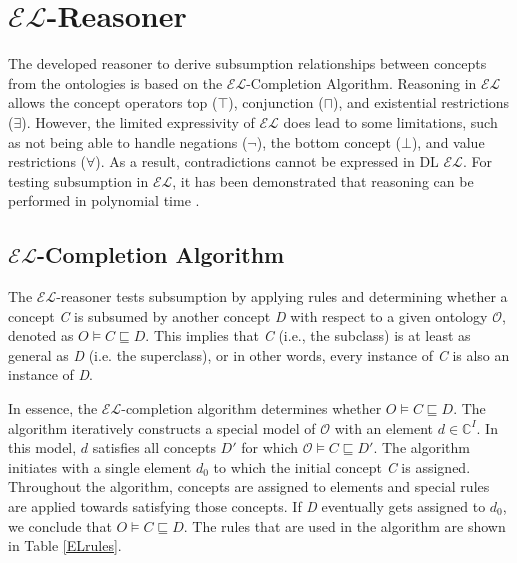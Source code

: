 \documentclass[a4paper]{article}
\theoremstyle{plain}
\theoremstyle{definition}
\begin{document}
	\section{$\mathcal{EL}$-Reasoner}
     The developed reasoner to derive subsumption relationships between concepts from the ontologies is based on the $\mathcal{EL}$-Completion Algorithm. Reasoning in $\mathcal{EL}$ allows the concept operators top ($\top$), conjunction ($\sqcap$), and existential restrictions ($\exists$). However, the limited expressivity of $\mathcal{EL}$ does lead to some limitations, such as not being able to handle negations ($\neg$), the bottom concept ($\bot$), and value restrictions ($\forall$). As a result, contradictions cannot be expressed in DL $\mathcal{EL}$. For testing subsumption in $\mathcal{EL}$, it has been demonstrated that reasoning can be performed in polynomial time \cite{Brandt}. 



    \subsection{$\mathcal{EL}$-Completion Algorithm}

    The $\mathcal{EL}$-reasoner tests subsumption by applying rules and determining whether a concept \textit{C} is subsumed by another concept \textit{D} with respect to a given ontology $\mathcal{O}$, denoted as $O \vDash C \sqsubseteq D$. This implies that \textit{C} (i.e., the subclass) is at least as general as \textit{D} (i.e. the superclass), or in other words, every instance of \textit{C} is also an instance of \textit{D}.
    
    In essence, the $\mathcal{EL}$-completion algorithm determines whether $O \vDash C \sqsubseteq D$. The algorithm iteratively constructs a special model of $\mathcal{O}$ with an element $d \in \mathbb{C}^I$. In this model, $d$ satisfies all concepts $D'$ for which $\mathcal{O}\models C \sqsubseteq D'$. The algorithm initiates with a single element $d_0$ to which the initial concept \textit{C} is assigned. Throughout the algorithm, concepts are assigned to elements and special rules are applied towards satisfying those concepts. If \textit{D} eventually gets assigned to $d_0$, we conclude that $O \vDash C \sqsubseteq D$. The rules that are used in the algorithm are shown in Table \ref{ELrules}.
\end{document}
